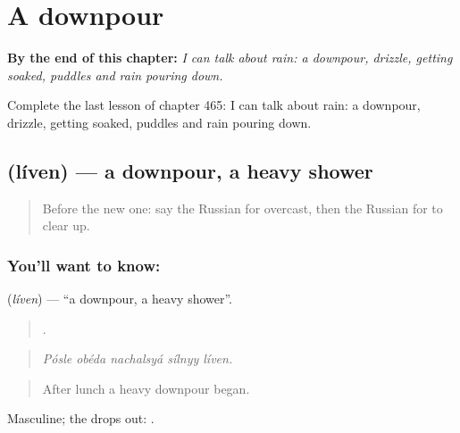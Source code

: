
\chapter{A downpour}
\label{ch:ru-a-downpour}

\begin{chapteropening}
\textbf{By the end of this chapter:} \emph{I can talk about rain: a downpour, drizzle, getting soaked, puddles and rain pouring down.}

Complete the last lesson of chapter 465: I can talk about rain: a downpour, drizzle, getting soaked, puddles and rain pouring down.
\end{chapteropening}

\section[\texorpdfstring{\ru{ливень} (líven)}{ливень (líven)}]{ (líven) — a downpour, a heavy shower}

\label{lesson:RU-C465-liven}



\begin{quote}
Before the new one: say the Russian for overcast, then the Russian for to clear up.
\end{quote}

\subsection*{You'll want to know: }
\textbf{} (\emph{líven}) — \textquotedblleft{}a downpour, a heavy shower\textquotedblright{}.

\begin{quote}
    .
\end{quote}

\begin{quote}
\emph{Pósle obéda nachalsyá sílnyy líven.}
\end{quote}

\begin{quote}
After lunch a heavy downpour began.
\end{quote}

Masculine; the  drops out: \emph{}.

